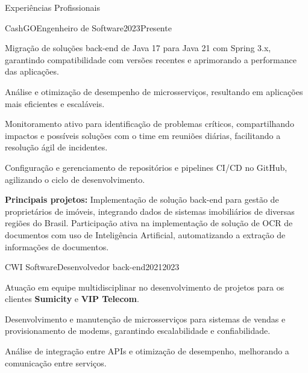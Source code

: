 \documentclass{domingosfelipe-resume}
\begin{document}
    
    \begin{rSection}{Experiências Profissionais}
    \begin{rExperienceSubsection}{CashGO}{Engenheiro de Software}{2023}{Presente}
        \item Migração de soluções back-end de Java 17 para Java 21 com Spring 3.x, garantindo compatibilidade com versões recentes e aprimorando a performance das aplicações.
        \item Análise e otimização de desempenho de microsserviços, resultando em aplicações mais eficientes e escaláveis.
        \item Monitoramento ativo para identificação de problemas críticos, compartilhando impactos e possíveis soluções com o time em reuniões diárias, facilitando a resolução ágil de incidentes.
        \item Configuração e gerenciamento de repositórios e pipelines CI/CD no GitHub, agilizando o ciclo de desenvolvimento.
        \item \textbf{Principais projetos:} Implementação de solução back-end para gestão de proprietários de imóveis, integrando dados de sistemas imobiliários de diversas regiões do Brasil. Participação ativa na implementação de solução de OCR de documentos com uso de Inteligência Artificial, automatizando a extração de informações de documentos.
    \end{rExperienceSubsection}
    \begin{rExperienceSubsection}{CWI Software}{Desenvolvedor back-end}{2021}{2023}
        \item Atuação em equipe multidisciplinar no desenvolvimento de projetos para os clientes \textbf{Sumicity} e \textbf{VIP Telecom}.
        \item Desenvolvimento e manutenção de microsserviços para sistemas de vendas e provisionamento de modems, garantindo escalabilidade e confiabilidade.
        \item Análise de integração entre APIs e otimização de desempenho, melhorando a comunicação entre serviços.

\end{rExperienceSubsection}
\end{rSection}
\end{document}
